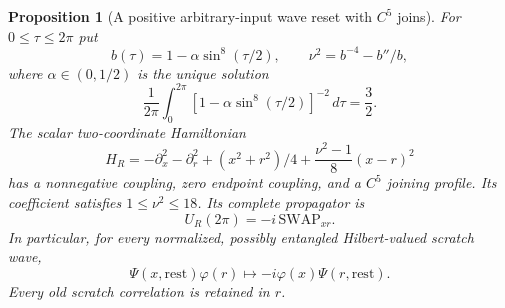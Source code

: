 \documentclass[11pt]{article}
\numberwithin{equation}{section}
\newtheorem{proposition}[theorem]{Proposition}
\theoremstyle{definition}
\theoremstyle{remark}
\begin{document}
\begin{proposition}[A positive arbitrary-input wave reset with $C^5$ joins]
\label{p2r:prop:reset}
For $0\leq\tau\leq2\pi$ put
\begin{equation}\label{p2r:eq:resetprofile}
 b(\tau)=1-\alpha\sin^8(\tau/2),\qquad
 \nu^2=b^{-4}-b''/b ,
\end{equation}
where $\alpha\in(0,1/2)$ is the unique solution
\begin{equation}\label{p2r:eq:root}
 \frac1{2\pi}\int_0^{2\pi}
              [1-\alpha\sin^8(\tau/2)]^{-2}\,d\tau=\frac32 .
\end{equation}
The scalar two-coordinate Hamiltonian
\begin{equation}\label{p2r:eq:resetH}
 H_R=-\partial_x^2-\partial_r^2+
                    (x^2+r^2)/4+\frac{\nu^2-1}{8}(x-r)^2
\end{equation}
has a nonnegative coupling, zero endpoint coupling, and a $C^5$
joining profile. Its coefficient satisfies $1\leq\nu^2\leq18$.
Its complete propagator is
\begin{equation}\label{p2r:eq:resetoperator}
 U_R(2\pi)=-i\,\mathrm{SWAP}_{xr}.
\end{equation}
In particular, for every normalized, possibly entangled
Hilbert-valued scratch wave,
\[
 \Psi(x,\mathrm{rest})\varphi(r)
       \longmapsto -i\varphi(x)\Psi(r,\mathrm{rest}).
\]
Every old scratch correlation is retained in $r$.
\end{proposition}
\end{document}
